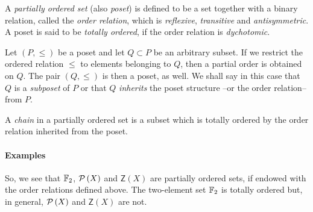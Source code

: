 \theoremstyle{plain}
\newtheorem{thmBoolAlgIsoBoolRng}{Theorem}[section]
\newtheorem{propoAbsorptiveLaws}[thmBoolAlgIsoBoolRng]{Proposition}
\newtheorem{thmJoinSemilat}[thmBoolAlgIsoBoolRng]{Theorem}
\newtheorem{thmJoinSemilatChar}[thmBoolAlgIsoBoolRng]{Theorem}
\newtheorem{thmMeetSemilat}[thmBoolAlgIsoBoolRng]{Theorem}
\newtheorem{thmMeetSemilatChar}[thmBoolAlgIsoBoolRng]{Theorem}
\newtheorem{lemmaDualDistLaw}[thmBoolAlgIsoBoolRng]{Lemma}
\newtheorem{propoDistLat}[thmBoolAlgIsoBoolRng]{Proposition}
\newtheorem{thmBoolAlgIsBoolRng}[thmBoolAlgIsoBoolRng]{Theorem}
\newtheorem{lemmaBoolRngIsDistLat}[thmBoolAlgIsoBoolRng]{Lemma}
\newtheorem{thmBoolRngIsBoolAlg}[thmBoolAlgIsoBoolRng]{Theorem}
\newtheorem{lemmaSymmDiff}[thmBoolAlgIsoBoolRng]{Lemma}


\theoremstyle{remark}
\newtheorem*{remarkJoinEmptySet}{Remark}
\newtheorem*{remarkMeetEmptySet}{Remark}
\newtheorem*{remarkBoolAlgIsFullInLat}{Remark}



A \emph{partially ordered set} (also \emph{poset}) is defined to be a set
together with a binary relation, called the \emph{order relation}, which is
\emph{reflexive}, \emph{transitive} and \emph{antisymmetric}. A poset
is said to be \emph{totally ordered}, if the order relation is
\emph{dychotomic}.

Let $(P,\leq)$ be a poset and let $Q\subset P$ be an arbitrary subset. If
we restrict the ordered relation $\leq$ to elements belonging to $Q$, then
a partial order is obtained on $Q$. The pair $(Q,\leq)$ is then a poset, as
well. We shall say in this case that $Q$ is a \emph{subposet} of $P$ or that
$Q$ \emph{inherits} the poset structure --or the order relation-- from $P$.

A \emph{chain} in a partially ordered set is a subset which is totally
ordered by the order relation inherited from the poset.

\paragraph{Examples}
So, we see that $\mathbb{F}_{2}$, $\mathcal{P}\left(X\right)$ and $\mathsf{Z}(X)$ are
partially ordered sets, if endowed with the order relations defined above.
The two-element set $\mathbb{F}_{2}$ is totally ordered but, in general,
$\mathcal{P}\left(X\right)$ and $\mathsf{Z}(X)$ are not. 


